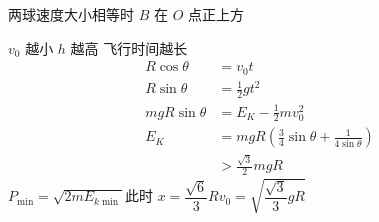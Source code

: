 两球速度大小相等时 $B$ 在 $O$ 点正上方%
\begin{problem}[1]

\begin{solution}
$v_0$ 越小 $h$ 越高 飞行时间越长
\begin{align*}
R\cos\theta&=v_0t\\
R\sin\theta&=\frac{1}{2}gt^2\\
mgR\sin\theta&=E_K-\frac{1}{2}mv_0^2\\
E_K&=mgR\left(\frac{3}{4}\sin\theta+\frac{1}{4\sin\theta}\right)\\
&>\frac{\sqrt{3}}{2}mgR %
\end{align*}
$P_{\min}=\sqrt{2mE_{k\min}}$\quad 此时 $x=\dfrac{\sqrt{6}}{3}R$\quad $v_0=\sqrt{\dfrac{\sqrt{3}}{3}gR}$
\end{solution}
\end{problem}
